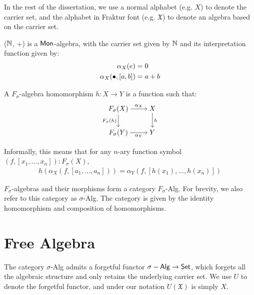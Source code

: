 In the rest of the dissertation, we use a normal alphabet
(e.g. $X$) to denote the carrier set, and the alphabet in Fraktur font
(e.g. $\mathfrak{X}$) to denote an algebra based on the carrier set.

\begin{example}
($\mathbb{N}$, +) is a $\operatorname{\mathsf{Mon}}$-algebra, with
the carrier set given by $\mathbb{N}$ and its interpretation function given by:
\begin{align*}
    \alpha_X(e) & = 0 \\
    \alpha_X(\mathbin{\bullet}, [a, b]) & = a + b
\end{align*}
\end{example}

\begin{definition}
    A $F_\sigma$-algebra homomorphism $h: X \rightarrow Y$ is a function such that:
\[\begin{tikzcd}[ampersand replacement=\&,cramped]
	{F_{\sigma}(X)} \& X \\
	{F_{\sigma}(Y)} \& Y
	\arrow["{\alpha_X}", from=1-1, to=1-2]
	\arrow["{F_{\sigma}(h)}"', from=1-1, to=2-1]
	\arrow["{\alpha_Y}"', from=2-1, to=2-2]
	\arrow["h", from=1-2, to=2-2]
\end{tikzcd}\]
\end{definition}

Informally, this means that for any $n$-ary function symbol $(f, [x_1, \dots, x_n]) : F_{\sigma}(X)$,
\begin{align*}
    h(\alpha_X(f, [a_1, \dots, a_n])) = \alpha_Y(f, [h(x_1), \dots, h(x_n)])
\end{align*}

$F_{\sigma}$-algebras and their morphisms form a category $F_\sigma$-Alg.
For brevity, we also refer to this category as $\sigma$-Alg. The category
is given by the identity homomorphism and composition of homomorphisms.

\section{Free Algebra}
The category $\sigma$-Alg admits a forgetful functor
$\sigma-\operatorname{\mathsf{Alg}} \to \mathsf{Set}$, which forgets all the algebraic structure
and only retains the underlying carrier set.
We use $U$ to denote the forgetful functor, and under our notation
$U(\mathfrak{X})$ is simply $X$.

